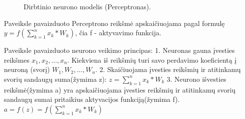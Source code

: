 \begin{figure}
  \centering
{}
\caption{Dirbtinio neurono modelis (Perceptronas).}
\end{figure}

Paveiksle pavaizduoto Perceptrono reikšmė apskaičiuojama pagal formulę \begin{math}y = f(\sum_{k=1}^{n} x_k * W_k)\end{math}, čia f - aktyvavimo funkcija.

Paveiksle pavaizduoto neurono veikimo principas:
1. Neuronas gauna įvesties reikšmes \begin{math}x_1, x_2, ... , x_n\end{math}. Kiekviena iš reikšmių turi savo perdavimo koeficientą į neuroną (svorį) \begin{math}W_1, W_2, ... , W_n\end{math}.
2. Skaičiuojama įvesties reikšmių ir atitinkamų svorių sandaugų suma(žymima z):
  \begin{math}z = \sum_{k=1}^{n} x_k * W_k\end{math}
3. Neurono išvesties reikšmė(žymima a) yra apskaičiuojama įvesties reikšmių ir atitinkamų svorių sandaugų sumai pritaikius aktyvacijos funkciją(žymima f).
  \begin{math}a = f(z) = f(\sum_{k=1}^{n} x_k * W_k)\end{math}

